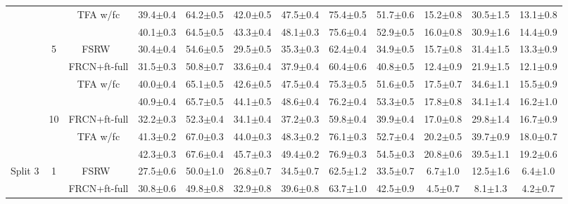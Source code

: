 \documentclass{article}
\newcommand{\model}{TFA\xspace}
\begin{document}
\begin{table*}[!h]
{\begin{tabular}{c|c|c|ccc|ccc|ccc}
    & &{\model w/fc} & 39.4$\pm$0.4 & 64.2$\pm$0.5 & 42.0$\pm$0.5 & 47.5$\pm$0.4 & 75.4$\pm$0.5 & 51.7$\pm$0.6 & 15.2$\pm$0.8 & 30.5$\pm$1.5 & 13.1$\pm$0.8  \\
    & & \cellcolor{Gray}{\model w/cos} & \cellcolor{Gray}40.1$\pm$0.3 &\cellcolor{Gray} 64.5$\pm$0.5 &\cellcolor{Gray} 43.3$\pm$0.4 &\cellcolor{Gray} 48.1$\pm$0.3 & \cellcolor{Gray}75.6$\pm$0.4 & \cellcolor{Gray}52.9$\pm$0.5 & \cellcolor{Gray}16.0$\pm$0.8 & \cellcolor{Gray}30.9$\pm$1.6 & \cellcolor{Gray}14.4$\pm$0.9  \\ \cmidrule{2-12}
    & \multirow{4}{*}{5} & FSRW~\cite{kang2019few} & 30.4$\pm$0.4&54.6$\pm$0.5&29.5$\pm$0.5&35.3$\pm$0.3&62.4$\pm$0.4&34.9$\pm$0.5&15.7$\pm$0.8&31.4$\pm$1.5&13.3$\pm$0.9 \\
    & & FRCN+ft-full & 31.5$\pm$0.3 & 50.8$\pm$0.7 & 33.6$\pm$0.4 & 37.9$\pm$0.4 & 60.4$\pm$0.6 & 40.8$\pm$0.5 & 12.4$\pm$0.9 & 21.9$\pm$1.5 & 12.1$\pm$0.9 \\
    & &{\model w/fc} & 40.0$\pm$0.4 & 65.1$\pm$0.5 & 42.6$\pm$0.5 & 47.5$\pm$0.4 & 75.3$\pm$0.5 & 51.6$\pm$0.5 & 17.5$\pm$0.7 & 34.6$\pm$1.1 & 15.5$\pm$0.9  \\
    & & \cellcolor{Gray}{\model w/cos} & \cellcolor{Gray}40.9$\pm$0.4 & \cellcolor{Gray}65.7$\pm$0.5 & \cellcolor{Gray}44.1$\pm$0.5 & \cellcolor{Gray}48.6$\pm$0.4 &\cellcolor{Gray} 76.2$\pm$0.4 & \cellcolor{Gray}53.3$\pm$0.5 & \cellcolor{Gray}17.8$\pm$0.8 &\cellcolor{Gray} 34.1$\pm$1.4 & \cellcolor{Gray}16.2$\pm$1.0  \\ \cmidrule{2-12}
    & \multirow{3}{*}{10} & FRCN+ft-full & 32.2$\pm$0.3 & 52.3$\pm$0.4 & 34.1$\pm$0.4 & 37.2$\pm$0.3 & 59.8$\pm$0.4 & 39.9$\pm$0.4 & 17.0$\pm$0.8 & 29.8$\pm$1.4 & 16.7$\pm$0.9 \\
    & & {\model w/fc} & 41.3$\pm$0.2 & 67.0$\pm$0.3 & 44.0$\pm$0.3 & 48.3$\pm$0.2 & 76.1$\pm$0.3 & 52.7$\pm$0.4 & 20.2$\pm$0.5 & 39.7$\pm$0.9 & 18.0$\pm$0.7  \\
    & & \cellcolor{Gray}{\model w/cos} & \cellcolor{Gray}42.3$\pm$0.3 &\cellcolor{Gray} 67.6$\pm$0.4 &\cellcolor{Gray} 45.7$\pm$0.3 &\cellcolor{Gray} 49.4$\pm$0.2 & \cellcolor{Gray}76.9$\pm$0.3 & \cellcolor{Gray}54.5$\pm$0.3 &\cellcolor{Gray} 20.8$\pm$0.6 &\cellcolor{Gray} 39.5$\pm$1.1 & \cellcolor{Gray}19.2$\pm$0.6  \\ \midrule
\multirow{21}{*}{Split 3} & \multirow{4}{*}{1} & FSRW~\cite{kang2019few} &
27.5$\pm$0.6&50.0$\pm$1.0&26.8$\pm$0.7&34.5$\pm$0.7&62.5$\pm$1.2&33.5$\pm$0.7&6.7$\pm$1.0&12.5$\pm$1.6&6.4$\pm$1.0 \\
    & & FRCN+ft-full & 30.8$\pm$0.6 & 49.8$\pm$0.8 & 32.9$\pm$0.8 & 39.6$\pm$0.8 & 63.7$\pm$1.0 & 42.5$\pm$0.9 & 4.5$\pm$0.7 & 8.1$\pm$1.3 & 4.2$\pm$0.7 \\

\end{tabular}}
\end{table*}
\end{document}
